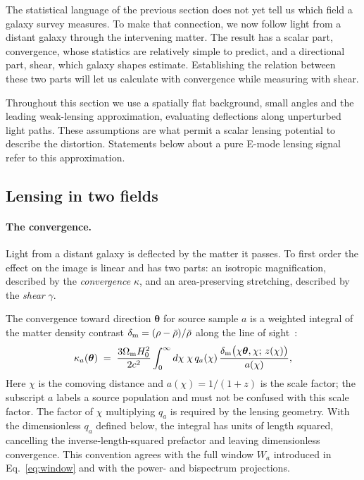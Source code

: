 \documentclass[11pt]{article}
\newcommand{\btheta}{\boldsymbol{\theta}}
\numberwithin{equation}{section}
\begin{document}
The statistical language of the previous section does not yet tell us
which field a galaxy survey measures. To make that connection, we now
follow light from a distant galaxy through the intervening matter. The
result has a scalar part, convergence, whose statistics are relatively
simple to predict, and a directional part, shear, which galaxy shapes
estimate. Establishing the relation between these two parts will let us
calculate with convergence while measuring with shear.

Throughout this section we use a spatially flat background, small angles
and the leading weak-lensing approximation, evaluating deflections along
unperturbed light paths. These assumptions are what permit a scalar
lensing potential to describe the distortion. Statements below about a
pure E-mode lensing signal refer to this approximation.

\subsection{Lensing in two fields}
\label{sec:kappa}

\paragraph{The convergence.}
Light from a distant galaxy is deflected by the matter it passes.  To
first order the effect on the image is linear and has two parts: an
isotropic magnification, described by the \emph{convergence}
$\kappa$, and an area-preserving stretching, described by the
\emph{shear} $\gamma$.

The convergence toward direction $\btheta$ for source sample $a$ is a
weighted integral of the matter density contrast
$\delta_{\rm m} = (\rho - \bar\rho)/\bar\rho$ along the line of
sight~\cite{GomesTATT}:
\begin{equation}
  \kappa_a(\btheta)
  \;=\; \frac{3\Omega_{\rm m} H_0^2}{2 c^2}
  \int_0^{\infty} d\chi\;
  \chi\,q_a(\chi)\,
  \frac{\delta_{\rm m}\bigl(\chi\btheta, \chi;\, z(\chi)\bigr)}
       {a(\chi)} ,
  \label{eq:kappadef}
\end{equation}
Here $\chi$ is the comoving distance and $a(\chi)=1/(1+z)$ is
the scale factor; the subscript $a$ labels a source population and must
not be confused with this scale factor. The factor of $\chi$ multiplying
$q_a$ is required by the lensing geometry. With the dimensionless
$q_a$ defined below, the integral has units of length squared, cancelling
the inverse-length-squared prefactor and leaving dimensionless convergence.
This convention agrees with the full window $W_a$ introduced in
Eq.~\eqref{eq:window} and with the power- and bispectrum projections.
\end{document}
